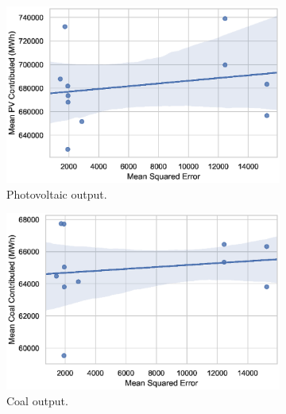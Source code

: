 \documentclass[final,3p,times,twocolumn,numbers]{elsarticle}
\begin{document}
\begin{figure}[h!]
\centering
\begin{subfigure}[b]{0.3\textwidth}
\includegraphics[width=\columnwidth]{figures/results/elecsim_results/results_2/contributed_PV_mean_output}
\caption{Photovoltaic output.}
\label{fig:contributed_PV_mean_output}
\end{subfigure}
\hfil
\begin{subfigure}[b]{0.3\textwidth}  
\includegraphics[width=\columnwidth]{figures/results/elecsim_results/results_2/contributed_Coal_mean_output.eps}
\caption{Coal output.}
\label{fig:contributed_Coal_mean_output}
\end{subfigure}
\hfil
\begin{subfigure}[b]{0.3\textwidth}   

\end{subfigure}
\end{figure}
\end{document}
